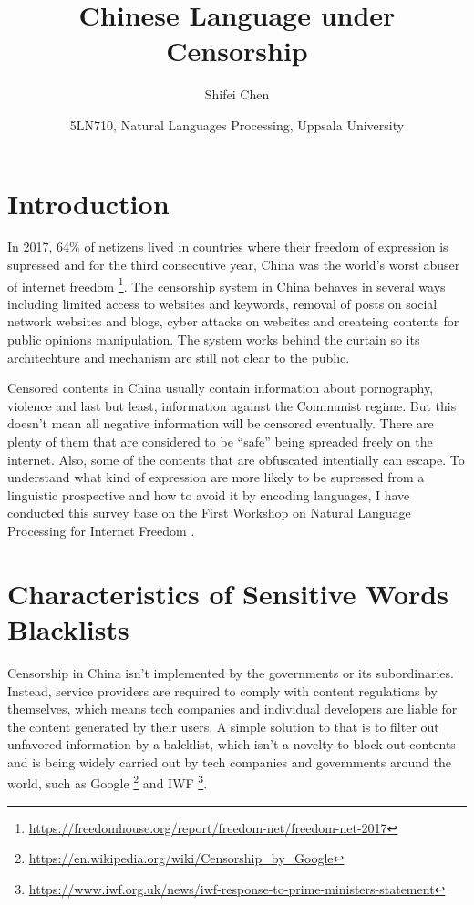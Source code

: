 \documentclass[11pt]{article} %
\title{{\LARGE Chinese Language under Censorship}\\[1.5mm]} %
\author{Shifei Chen\\} %
\date{5LN710, Natural Languages Processing, Uppsala University}
\begin{document}
\maketitle

\section{Introduction}

In 2017, 64\% of netizens lived in countries where their freedom of expression is supressed and for the third consecutive year, China was the world's worst abuser of internet freedom \footnote{\url{https://freedomhouse.org/report/freedom-net/freedom-net-2017}}. The censorship system in China behaves in several ways including limited access to websites and keywords, removal of posts on social network websites and blogs, cyber attacks on websites and createing contents for public opinions manipulation. The system works behind the curtain so its architechture and mechanism are still not clear to the public.

Censored contents in China usually contain information about pornography, violence and last but least, information against the Communist regime. But this doesn't mean all negative information will be censored eventually. There are plenty of them that are considered to be ``safe'' being spreaded freely on the internet. Also, some of the contents that are obfuscated intentially can escape. To understand what kind of expression are more likely to be supressed from a linguistic prospective and how to avoid it by encoding languages, I have conducted this survey base on the First Workshop on Natural Language Processing for Internet Freedom \cite{brew2018proceedings}.

\section{Characteristics of Sensitive Words Blacklists}

Censorship in China isn't implemented by the governments or its subordinaries. Instead, service providers are required to comply with content regulations by themselves, which means tech companies and individual developers are liable for the content generated by their users. A simple solution to that is to filter out unfavored information by a balcklist, which isn't a novelty to block out contents and is being widely carried out by tech companies and governments around the world, such as Google \footnote{\url{https://en.wikipedia.org/wiki/Censorship_by_Google}} and IWF \footnote{\url{https://www.iwf.org.uk/news/iwf-response-to-prime-ministers-statement}}.
\end{document}
